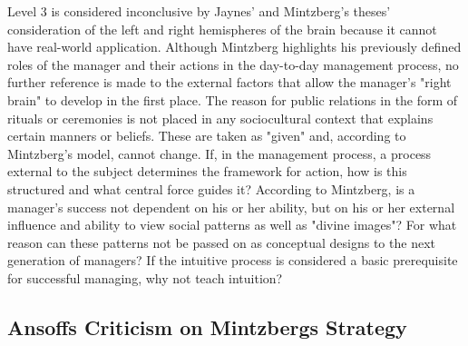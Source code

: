 \documentclass[a4paper,12pt]{article}
\begin{document}
Level 3 is considered inconclusive by Jaynes' and Mintzberg's theses'
consideration of the left and right hemispheres of the brain because it cannot
have real-world application. Although Mintzberg highlights his previously
defined roles of the manager and their actions in the day-to-day management
process, no further reference is made to the external factors that allow the
manager's "right brain" to develop in the first place. The reason for public
relations in the form of rituals or ceremonies is not placed in any
sociocultural context that explains certain manners or beliefs. These are
taken as "given" and, according to Mintzberg's model, cannot change. If, in
the management process, a process external to the subject determines the
framework for action, how is this structured and what central force guides it?
According to Mintzberg, is a manager's success not dependent on his or her
ability, but on his or her external influence and ability to view social
patterns as well as "divine images"? For what reason can these patterns not be
passed on as conceptual designs to the next generation of managers? If the
intuitive process is considered a basic prerequisite for successful managing,
why not teach intuition?

\subsection{Ansoffs Criticism on Mintzbergs Strategy}
\end{document}
